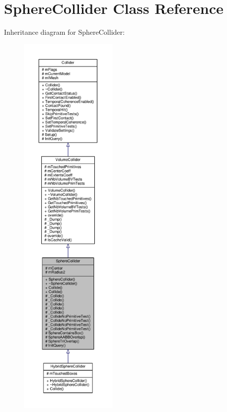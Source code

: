 \hypertarget{classSphereCollider}{}\section{Sphere\+Collider Class Reference}
\label{classSphereCollider}


Inheritance diagram for Sphere\+Collider\+:
\nopagebreak
\begin{figure}[H]
\begin{center}
\leavevmode
\includegraphics[height=550pt]{d7/d95/classSphereCollider__inherit__graph}
\end{center}
\end{figure}



